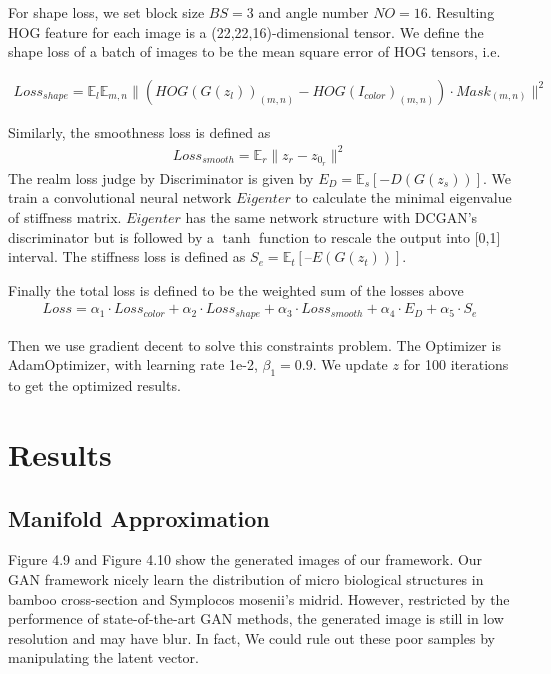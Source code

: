 For shape loss, we set block size $BS = 3$ and angle number $NO = 16$. Resulting HOG feature for each image is a (22,22,16)-dimensional tensor. We define the shape loss of a batch of images to be the mean square error of HOG tensors, i.e.

\begin{equation}
\begin{aligned}
Loss_{shape}=\mathbb{E}_{l}\mathbb{E}_{m,n}\|(HOG(G(z_l))_{(m,n)}-HOG(I_{color})_{(m,n)})\cdot Mask_{(m,n)}\|^2
\end{aligned}
\end{equation}

Similarly, the smoothness loss is defined as 
\begin{equation}
\begin{aligned}
Loss_{smooth}=\mathbb{E}_{r}\|z_r - z_{0_r}\|^2
\end{aligned}
\end{equation}
The realm loss judge by Discriminator is given by $E_D = \mathbb{E}_s[-D(G(z_s))]$. We train a convolutional neural network $Eigenter$ to calculate the minimal eigenvalue of stiffness matrix. $Eigenter$ has the same network structure with DCGAN's discriminator but is followed by a $\tanh$ function to rescale the output into [0,1] interval. The stiffness loss is defined as $S_e = \mathbb{E}_{t}[–E(G(z_t))]$.



Finally the total loss is defined to be the weighted sum of the losses above
\begin{equation}
\begin{aligned}
Loss = \alpha_1\cdot Loss_{color} + \alpha_2\cdot Loss_{shape} + \alpha_3\cdot Loss_{smooth} + \alpha_4\cdot E_D + \alpha_5\cdot S_e
\end{aligned}
\end{equation}


Then we use gradient decent to solve this constraints problem. The Optimizer is AdamOptimizer, with learning rate 1e-2, $\beta_1=0.9$. We update $z$ for 100 iterations to get the optimized results.
\section{Results}

\subsection{Manifold Approximation}

Figure 4.9 and Figure 4.10 show the generated images of our framework. Our GAN framework nicely learn the distribution of micro biological structures in bamboo cross-section and Symplocos mosenii's midrid. However, restricted by the performence of state-of-the-art GAN methods, the generated image is still in low resolution and may have blur. In fact, We could rule out these poor samples by manipulating the latent vector. 

